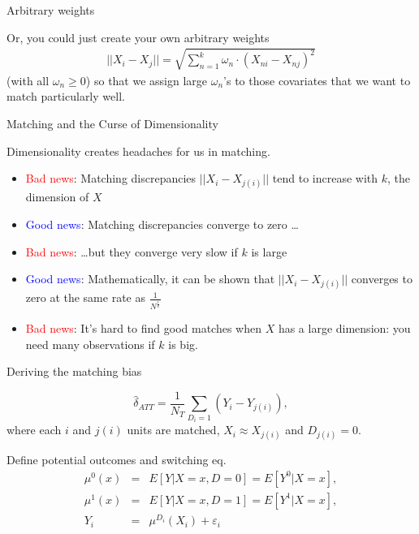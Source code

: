\documentclass{beamer}
\begin{document}
\begin{frame}{Arbitrary weights}
	
	Or, you could just create your own arbitrary weights
		\begin{eqnarray*}
		||X_i-X_j|| = \sqrt{ \sum_{n=1}^k \omega_n \cdot (X_{ni} - X_{nj})^2}
		\end{eqnarray*}(with all $\omega_n\geq{0}$) so that we assign large $\omega_n$'s to those covariates that we want to match particularly well.

\end{frame}

\begin{frame}{Matching and the Curse of Dimensionality}
	
Dimensionality creates headaches for us in matching.
	\begin{itemize}
	\item \textcolor{red}{Bad news}: Matching discrepancies $||X_i-X_{j(i)}||$ tend to increase with $k$, the dimension of $X$
	\item \textcolor{blue}{Good news}: Matching discrepancies converge to zero \dots
	\item \textcolor{red}{Bad news}: \dots but they converge very slow if $k$ is large
	\item \textcolor{blue}{Good news}: Mathematically, it can be shown that $||X_i-X_{j(i)}||$ converges to zero at the same rate as $\frac{1}{N^{\frac{1}{k}}}$
	\item \textcolor{red}{Bad news}: It's hard to find good matches when $X$ has a large dimension:  you need many observations if $k$ is big.
	\end{itemize}
\end{frame}


\begin{frame}{Deriving the matching bias}
	
  \vspace{-5mm}
  $$
		\widehat{\delta}_{ATT} = \frac{1}{N_T} \sum_{D_i=1} (Y_i - Y_{j(i)}),
  $$
  where each $i$ and $j(i)$ units are matched, $X_i \approx X_{j(i)}$ and $D_{j(i)}=0$. 
	 
  \bigskip
  Define potential outcomes and switching eq.
		\begin{eqnarray*}
      \mu^0(x) &=& E[Y | X=x,D=0] = E[Y^0 | X=x],\\
      \mu^1(x) &=& E[Y | X=x,D=1] = E[Y^1 | X=x],\\
      Y_i &=& \mu^{D_i}(X_i) + \varepsilon_i
		\end{eqnarray*}
\end{frame}
\end{document}
